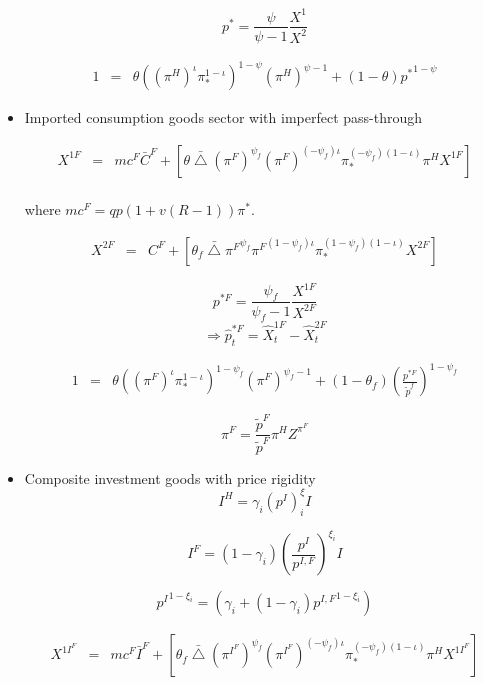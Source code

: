 \documentclass[11pt, a4paper]{article}
\begin{document}
\begin{itemize}
\[p^* = \frac{\psi}{\psi-1} \frac{X^1}{X^2} \]

\begin{eqnarray*}
1 &=&  {\theta} {({(\pi^H)}^\iota \pi_*^{1-\iota})}^{1-\psi} {(\pi^H)}^{\psi-1}  + (1-\theta)  {p^{*}}^{1-\psi}
\end{eqnarray*} 

\item Imported consumption goods sector with imperfect pass-through

\begin{eqnarray*} X^{1F} &=&  mc^F \bar{C}^F + \left[\theta \bar{\bigtriangleup}  {(\pi^F)}^{\psi_f} {(\pi^F)}^{(-\psi_f)\iota} \pi_*^{{(-\psi_f)}(1-\iota) } \pi^H X^{1F} \right] \end{eqnarray*} 
\\
where  $mc^F  = q p(1+v(R -1))\pi^{*}$. 

\begin{eqnarray*} X^{2F} &=&  C^F + \left[\theta_f \bar{\bigtriangleup}  {\pi^F}^{\psi_f} {\pi^F}^{(1-\psi_f)\iota} \pi_*^{(1-\psi_f)(1-\iota) } X^{2F} \right]
\end{eqnarray*} 

\[p^{*F} = \frac{\psi_f}{\psi_f-1} \frac{X^{1F}}{X^{2F}} \]
\begin{equation} \Rightarrow \widehat{p}_t^{*F} = \widehat{X}_t^{1F} - \widehat{X}_t^{2F}\end{equation}

\begin{eqnarray*}
1 &=&  {\theta} {({(\pi^F)}^{\iota} \pi_*^{1-\iota})}^{1-\psi_f} {(\pi^F)}^{\psi_f-1}  + (1-\theta_f)  \left({\frac{p^{*F}} {\tilde{p}^{f}}}\right)^{1-\psi_f}
\end{eqnarray*} 

\[ \pi^F = \frac{\tilde{p}^{F}} {\tilde{p}^{F}} \pi^H Z^{\pi^F}\]


\item Composite investment goods with price rigidity
\[I^H = \gamma_i {\left(p^I \right)}^\xi_i I\]
 
  \[I^F = (1-\gamma_i) \left(\frac{p^I}{p^{I,F}}\right)^{\xi_{i}} I  \]
 
 
 \[{p^I}^{1-\xi_i} = \left(\gamma_i + (1-\gamma_i){p^{I,F}}^{1-\xi_i}\right) \]

\begin{eqnarray*} X^{1I^F} &=&  mc^F \bar{I}^F + \left[\theta_f \bar{\bigtriangleup}  {(\pi^{I^F})}^{\psi_f} {(\pi^{I^F})}^{(-\psi_f)\iota} \pi_*^{{(-\psi_f)}(1-\iota) } \pi^H X^{1I^F} \right] \end{eqnarray*} 



\end{itemize}
\end{document}

